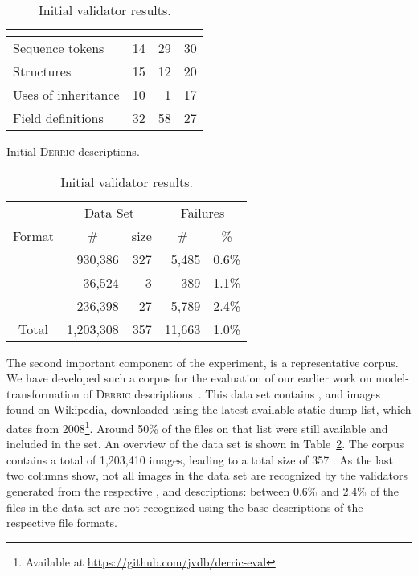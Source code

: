 \documentclass[a4paper]{llncs}
\def\derric{\textsc{Derric}\xspace}
\newcommand{\JPEG}{\textsmaller{JPEG}\xspace}
\newcommand{\GIF}{\textsmaller{GIF}\xspace}
\newcommand{\PNG}{\textsmaller{PNG}\xspace}
\newcommand{\GB}{\textsmaller{GB}\xspace}
\begin{document}
\begin{table}[h]\centering
\begin{minipage}{.49\textwidth}\centering
\vspace{13pt}
\begin{tabular}{lrrr}
& \multicolumn{1}{c}{\JPEG} & \multicolumn{1}{c}{\GIF} & \multicolumn{1}{c}{\PNG} \\
\midrule
Sequence tokens & 14 & 29 & 30 \\
Structures & 15 & 12 & 20 \\
Uses of inheritance & 10 & 1 & 17 \\
Field definitions & 32 & 58 & 27 \\
\midrule
\end{tabular}
\vspace{5pt}
\caption{Initial \derric descriptions.\label{tab:initial}}
\end{minipage}
\begin{minipage}{.49\textwidth}\centering
\begin{tabular}{crrrr}
& \multicolumn{2}{c}{Data Set} &
\multicolumn{2}{c}{Failures}\\
\multicolumn{1}{c}{Format} &
\multicolumn{1}{c}{\#} & \multicolumn{1}{c}{size} &
\multicolumn{1}{c}{\#} & \multicolumn{1}{c}{\%}\\
\midrule
\JPEG &
930,386 & 327\GB &
5,485 & 0.6\% \\
\GIF &
36,524 & 3\GB &
389 & 1.1\% \\
\PNG &
236,398 & 27\GB &
5,789 & 2.4\% \\
\midrule
Total & 1,203,308 & 357\GB &
11,663 & 1.0\% \\
\end{tabular}
\vspace{5pt}
\caption{Initial validator results.\label{TAB:initial}}
\end{minipage}
\end{table}

The second important component of the experiment, is a representative corpus. 
We have developed such a corpus for the evaluation of our earlier work on model-transformation of \derric descriptions~\cite{derric_transformations}. 
This data set contains \JPEG, \GIF and \PNG images found on Wikipedia, downloaded using the latest available static dump list, which dates from 2008\footnote{Available at \url{https://github.com/jvdb/derric-eval}}.
Around 50\% of the files on that list were still available and included in the set.
An overview of the data set is shown in Table~\ref{TAB:initial}. 
The corpus contains a total of 1,203,410 images, leading to a total size of 357 \GB. 
As the last two columns show, not all images in the data set are recognized by the validators generated from the respective \JPEG, \GIF and \PNG descriptions: between 0.6\% and 2.4\% of the files in the data set are not recognized using the base descriptions of the respective file formats.
\end{document}
